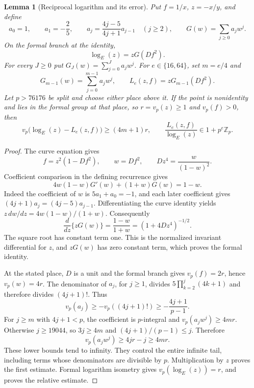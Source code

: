 \documentclass[11pt]{article}
\newtheorem{lemma}[theorem]{Lemma}
\theoremstyle{definition}
\theoremstyle{remark}
\newcommand{\Z}{\mathbb Z}
\begin{document}
\begin{lemma}[Reciprocal logarithm and its error]
\label{lem:quartic-reciprocal-log}
Put $f=1/x$, $z=-x/y$, and define
\[
 a_0=1,\qquad a_1=-\frac25,\qquad
 a_j=\frac{4j-5}{4j+1}a_{j-1}\quad(j\ge2),\qquad
 G(w)=\sum_{j\ge0}a_jw^j.
\]
On the formal branch at the identity,
\[
 \log_E(z)=zG(Df^2).
\]
For every $J\ge0$ put $G_J(w)=\sum_{j=0}^{J}a_jw^j$.
For $e\in\{16,64\}$, set $m=e/4$ and
\[
 G_{m-1}(w)=\sum_{j=0}^{m-1}a_jw^j,\qquad
 L_e(z,f)=zG_{m-1}(Df^2).
\]
Let $p>76176$ be split and choose either place above it. If the point is
nonidentity and lies in the formal group at that place, so
$r=v_p(z)\ge1$ and $v_p(f)>0$, then
\[
 v_p\bigl(\log_E(z)-L_e(z,f)\bigr)\ge(4m+1)r,
 \qquad \frac{L_e(z,f)}{\log_E(z)}\in1+p^e\Z_p.
\]
\end{lemma}
\begin{proof}
The curve equation gives
\[
 f=z^2(1-Df^2),\qquad w=Df^2,\qquad Dz^4=\frac{w}{(1-w)^2}.
\]
Coefficient comparison in the defining recurrence gives
\[
 4w(1-w)G'(w)+(1+w)G(w)=1-w.
\]
Indeed the coefficient of $w$ is $5a_1+a_0=-1$, and each later
coefficient gives $(4j+1)a_j=(4j-5)a_{j-1}$. Differentiating the
curve identity yields $z\,dw/dz=4w(1-w)/(1+w)$. Consequently
\[
 \frac{d}{dz}\{zG(w)\}=\frac{1-w}{1+w}
                   =(1+4Dz^4)^{-1/2}.
\]
The square root has constant term one. This is the normalized invariant
differential for $z$, and $zG(w)$ has zero constant term, which proves
the formal identity.

At the stated place, $D$ is a unit and the formal branch gives
$v_p(f)=2r$, hence $v_p(w)=4r$. The denominator of $a_j$, for $j\ge1$,
divides $5\prod_{k=2}^j(4k+1)$ and therefore divides $(4j+1)!$.
Thus
\[
 v_p(a_j)\ge-v_p((4j+1)!)\ge-\frac{4j+1}{p-1}.
\]
For $j\ge m$ with $4j+1<p$, the coefficient is $p$-integral and
$v_p(a_jw^j)\ge4mr$. Otherwise $j\ge19044$, so $3j\ge4m$ and
$(4j+1)/(p-1)\le j$. Therefore
\[
 v_p(a_jw^j)\ge4jr-j\ge4mr.
\]
These lower bounds tend to infinity. They control the entire infinite
tail, including terms whose denominators are divisible by $p$.
Multiplication by $z$ proves the first estimate. Formal logarithm isometry
gives $v_p(\log_E(z))=r$, and proves the relative estimate.
\end{proof}
\end{document}
